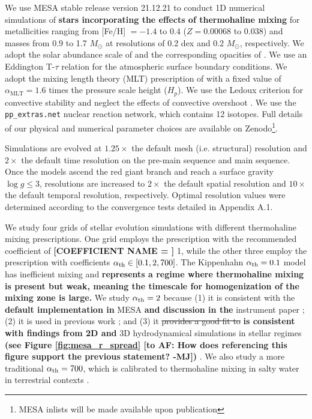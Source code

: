 %
%
%
We use MESA stable release version 21.12.21 to conduct 1D numerical simulations of \textbf{stars incorporating the effects of thermohaline mixing} for metallicities ranging from [Fe/H] $= -1.4$ to $0.4$ ($Z = 0.00068$ to $0.038$) and masses from 0.9 to 1.7 $M_{\odot}$ at resolutions of 0.2 dex and 0.2 $M_{\odot}$, respectively. We adopt the solar abundance scale of \citet{GrevesseSauval1998} and the corresponding opacities of \citet{IglesiasRogers1996}. We use an Eddington T-$\tau$ relation for the atmospheric surface boundary conditions.
We adopt the mixing length theory (MLT) prescription of \citet{Cox1980} with a fixed value of $\alpha_{\text{MLT}}= 1.6$ times the pressure scale height ($H_p$). We use the Ledoux criterion for convective stability and neglect the effects of convective overshoot \citep{Ledoux1947}. We use the \verb|pp_extras.net| nuclear reaction network, which contains 12 isotopes. Full details of our physical and numerical parameter choices are available on Zenodo\footnote{MESA inlists will be made available upon publication}. 

Simulations are evolved at $1.25\times$ the default mesh (i.e. structural) resolution and $2\times$ the default time resolution on the pre-main sequence and main sequence. Once the models ascend the red giant branch and reach a surface gravity $\log g \le 3$, resolutions are increased to $2\times$ the default spatial resolution and $10\times$ the default temporal resolution, respectively. Optimal resolution values were determined according to the convergence tests detailed in Appendix A.1. 

We study four grids of stellar evolution simulations with different thermohaline mixing prescriptions. One grid employs the \citet{brown_etal_2013} prescription with the recommended coefficient of \textbf{[COEFFICIENT NAME = ]} 1, while the other three employ the \citet{kippenhahn_etal_1980} prescription with coefficients $\alpha_{\rm th} \in [0.1, 2, 700]$. 
The Kippenhahn $\alpha_{\rm th} = 0.1$ model has inefficient mixing and \textbf{represents a regime where thermohaline mixing is present but weak, meaning the timescale for homogenization of the mixing zone is large.}
%
%
We study $\alpha_{\rm th} = 2$ because (1) it is consistent with the \textbf{default implementation in} MESA \textbf{and discussion in the} instrument paper \citep{paxton2013}; (2) it is used in previous work \citep{CantielloLanger2010, TayarJoyce22}; and (3) it \sout{provides a good fit to} \textbf{is consistent with findings from 2D and} 3D hydrodynamical simulations in stellar regimes \textbf{(see Figure \ref{fig:mesa_r_spread} [to AF: How does referencing this figure support the previous statement? -MJ])} \citep{Denissenkov2010, Traxler2011, brown_etal_2013}. 
We also study a more traditional $\alpha_{\rm th} = 700$, which is calibrated to thermohaline mixing in salty water in terrestrial contexts \citep{lattanzio_etal_2015, charbonnel_thermohaline_2007}. 


